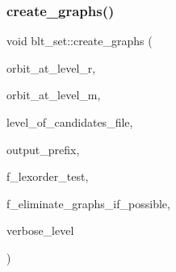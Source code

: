 \subsubsection{\texorpdfstring{create\+\_\+graphs()}{create\_graphs()}}
{\footnotesize\ttfamily void blt\+\_\+set\+::create\+\_\+graphs (\begin{DoxyParamCaption}\item[{\mbox{\hyperlink{galois_8h_a09fddde158a3a20bd2dcadb609de11dc}{I\+NT}}}]{orbit\+\_\+at\+\_\+level\+\_\+r,  }\item[{\mbox{\hyperlink{galois_8h_a09fddde158a3a20bd2dcadb609de11dc}{I\+NT}}}]{orbit\+\_\+at\+\_\+level\+\_\+m,  }\item[{\mbox{\hyperlink{galois_8h_a09fddde158a3a20bd2dcadb609de11dc}{I\+NT}}}]{level\+\_\+of\+\_\+candidates\+\_\+file,  }\item[{const \mbox{\hyperlink{galois_8h_ab6cc7b4aeb6ea31aba2b3fbfc83ff5e6}{B\+Y\+TE}} $\ast$}]{output\+\_\+prefix,  }\item[{\mbox{\hyperlink{galois_8h_a09fddde158a3a20bd2dcadb609de11dc}{I\+NT}}}]{f\+\_\+lexorder\+\_\+test,  }\item[{\mbox{\hyperlink{galois_8h_a09fddde158a3a20bd2dcadb609de11dc}{I\+NT}}}]{f\+\_\+eliminate\+\_\+graphs\+\_\+if\+\_\+possible,  }\item[{\mbox{\hyperlink{galois_8h_a09fddde158a3a20bd2dcadb609de11dc}{I\+NT}}}]{verbose\+\_\+level }\end{DoxyParamCaption})}

\mbox{\label{classblt__set_a91ad531d4154bd887182dbd6121476f3}} 
